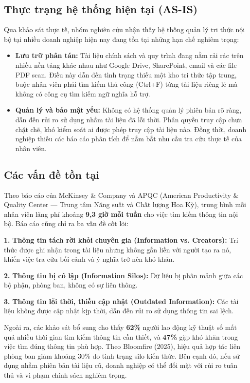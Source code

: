 \documentclass[12pt,a4paper]{report}
\begin{document}
\subsection{Thực trạng hệ thống hiện tại (AS-IS)}
Qua khảo sát thực tế, nhóm nghiên cứu nhận thấy hệ thống quản lý tri thức nội bộ tại nhiều doanh nghiệp hiện nay đang tồn tại những hạn chế nghiêm trọng:
\begin{itemize}
    \item \textbf{Lưu trữ phân tán:} Tài liệu chính sách và quy trình đang nằm rải rác trên nhiều nền tảng khác nhau như Google Drive, SharePoint, email và các file PDF scan. Điều này dẫn đến tình trạng thiếu một kho tri thức tập trung, buộc nhân viên phải tìm kiếm thủ công (Ctrl+F) từng tài liệu riêng lẻ mà không có công cụ tìm kiếm ngữ nghĩa hỗ trợ.
    \item \textbf{Quản lý và bảo mật yếu:} Không có hệ thống quản lý phiên bản rõ ràng, dẫn đến rủi ro sử dụng nhầm tài liệu đã lỗi thời. Phân quyền truy cập chưa chặt chẽ, khó kiểm soát ai được phép truy cập tài liệu nào. Đồng thời, doanh nghiệp thiếu các báo cáo phân tích để nắm bắt nhu cầu tra cứu thực tế của nhân viên.
\end{itemize}

\subsection{Các vấn đề tồn tại}
Theo báo cáo của McKinsey \& Company và APQC (American Productivity \& Quality Center — Trung tâm Năng suất và Chất lượng Hoa Kỳ), trung bình mỗi nhân viên lãng phí khoảng \textbf{9,3 giờ mỗi tuần} cho việc tìm kiếm thông tin nội bộ. Báo cáo cũng chỉ ra ba vấn đề cốt lõi:

\textbf{1.} \textbf{Thông tin tách rời khỏi chuyên gia (Information vs. Creators):} Tri thức được ghi nhận trong tài liệu nhưng không gắn liền với người tạo ra nó, khiến việc tra cứu bối cảnh và ý nghĩa trở nên khó khăn.


\textbf{2.} \textbf{Thông tin bị cô lập (Information Silos):} Dữ liệu bị phân mảnh giữa các bộ phận, phòng ban, không có sự liên thông.


\textbf{3.} \textbf{Thông tin lỗi thời, thiếu cập nhật (Outdated Information):} Các tài liệu không được cập nhật kịp thời, dẫn đến rủi ro sử dụng thông tin sai lệch.


Ngoài ra, các khảo sát bổ sung cho thấy \textbf{62\%} người lao động kỹ thuật số mất quá nhiều thời gian tìm kiếm thông tin cần thiết, và \textbf{47\%} gặp khó khăn trong việc tìm đúng thông tin phù hợp. Theo Bloomfire (2025), hiệu quả hợp tác liên phòng ban giảm khoảng 30\% do tình trạng silo kiến thức. Bên cạnh đó, nếu sử dụng nhầm phiên bản tài liệu cũ, doanh nghiệp có thể đối mặt với rủi ro tuân thủ và vi phạm chính sách nghiêm trọng.
\end{document}
